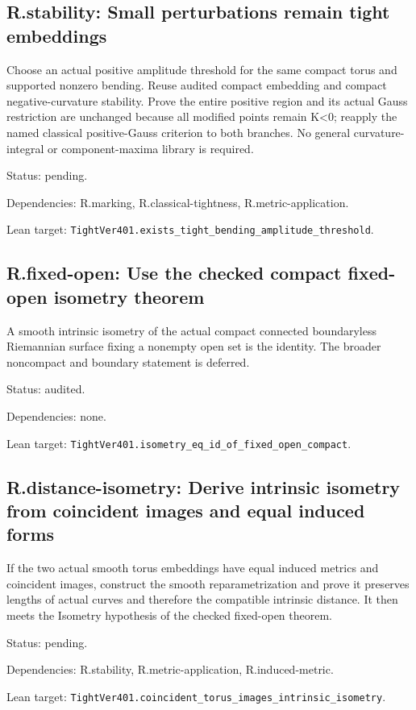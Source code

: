 \documentclass{article}
\begin{document}
\subsection*{R.stability: Small perturbations remain tight embeddings}
Choose an actual positive amplitude threshold for the same compact torus and supported nonzero bending. Reuse audited compact embedding and compact negative-curvature stability. Prove the entire positive region and its actual Gauss restriction are unchanged because all modified points remain K<0; reapply the named classical positive-Gauss criterion to both branches. No general curvature-integral or component-maxima library is required.
\par Status: pending.
\par Dependencies: R.marking, R.classical-tightness, R.metric-application.
\par Lean target: \texttt{TightVer401.exists\_tight\_bending\_amplitude\_threshold}.
\subsection*{R.fixed-open: Use the checked compact fixed-open isometry theorem}
A smooth intrinsic isometry of the actual compact connected boundaryless Riemannian surface fixing a nonempty open set is the identity. The broader noncompact and boundary statement is deferred.
\par Status: audited.
\par Dependencies: none.
\par Lean target: \texttt{TightVer401.isometry\_eq\_id\_of\_fixed\_open\_compact}.
\subsection*{R.distance-isometry: Derive intrinsic isometry from coincident images and equal induced forms}
If the two actual smooth torus embeddings have equal induced metrics and coincident images, construct the smooth reparametrization and prove it preserves lengths of actual curves and therefore the compatible intrinsic distance. It then meets the Isometry hypothesis of the checked fixed-open theorem.
\par Status: pending.
\par Dependencies: R.stability, R.metric-application, R.induced-metric.
\par Lean target: \texttt{TightVer401.coincident\_torus\_images\_intrinsic\_isometry}.
\end{document}
